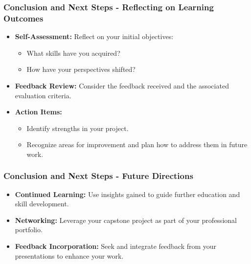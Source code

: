 \documentclass{beamer}
\begin{document}
\begin{frame}[fragile]
    \frametitle{Conclusion and Next Steps - Reflecting on Learning Outcomes}
    \begin{itemize}
        \item \textbf{Self-Assessment:}
        Reflect on your initial objectives:
        \begin{itemize}
            \item What skills have you acquired?
            \item How have your perspectives shifted?
        \end{itemize}

        \item \textbf{Feedback Review:} 
        Consider the feedback received and the associated evaluation criteria.

        \item \textbf{Action Items:}
        \begin{itemize}
            \item Identify strengths in your project.
            \item Recognize areas for improvement and plan how to address them in future work.
        \end{itemize}
    \end{itemize}
\end{frame}

\begin{frame}[fragile]
    \frametitle{Conclusion and Next Steps - Future Directions}
    \begin{itemize}
        \item \textbf{Continued Learning:} 
        Use insights gained to guide further education and skill development.

        \item \textbf{Networking:} 
        Leverage your capstone project as part of your professional portfolio.

        \item \textbf{Feedback Incorporation:} 
        Seek and integrate feedback from your presentations to enhance your work.
    \end{itemize}
\end{frame}
\end{document}
